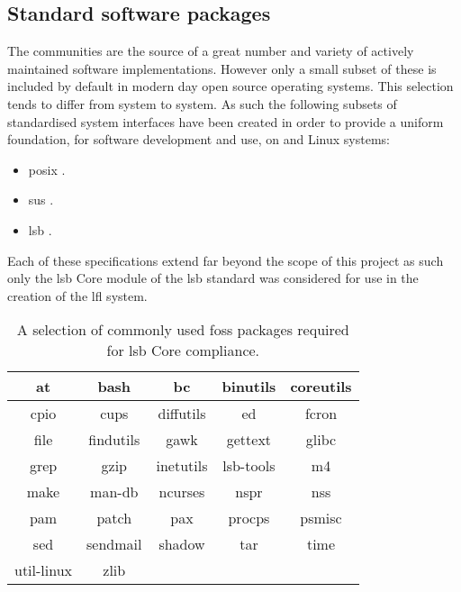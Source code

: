 \subsection{Standard software packages}

The  communities are the source of a great number and variety of actively maintained software implementations. However only a small subset of these is included by default in modern day open source operating systems. This selection tends to differ from system to system. As such the following subsets of standardised system interfaces have been created in order to provide a uniform foundation, for software development and use, on  and Linux systems:

\begin{itemize}
    \item \gls{posix} \cite{posix}.
    \item \gls{sus} \cite{susv4}.
    \item \gls{lsb} \cite{lsb}.
\end{itemize}

Each of these specifications extend far beyond the scope of this project as such only the \gls{lsb} Core module of the \gls{lsb} standard was considered for use in the creation of the \gls{lfl} system.

\begin{table}[H]
    \centering
    \begin{tabular}{|c|c|c|c|c|}
        \hline
        at & bash & bc & binutils & coreutils \\
        \hline
        cpio & cups & diffutils & ed & fcron \\
        \hline
        file & findutils & gawk & gettext & glibc \\
        \hline
        grep & gzip & inetutils & lsb-tools & m4 \\
        \hline
        make & man-db & ncurses & nspr & nss \\
        \hline
        pam & patch & pax & procps & psmisc \\
        \hline
        sed & sendmail & shadow & tar & time \\
        \hline
        util-linux & zlib \\
        \cline{1-2}
    \end{tabular}
    \caption{A selection of commonly used \gls{foss} packages required for \gls{lsb} Core compliance.}
    \label{table:LSB Core standard packages}
\end{table}

